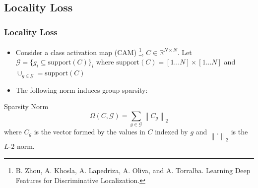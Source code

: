 \subsection{Locality Loss}

\begin{frame}
	\frametitle{Locality Loss}
	\begin{itemize}
		\item Consider a class activation map (CAM) \footnote{\tiny{B. Zhou, A. Khosla, A.
				Lapedriza, A. Oliva, and A. Torralba. Learning Deep Features for Discriminative
		Localization.}}, $C \in \mathbb{R}^{N \times N}$. Let $\mathcal{G} = \{g_i
			\subseteq \textrm{support}(C)\}_i$ where $\textrm{support}(C) = [1 \dots N] \times [1
			\dots N]$ and $\cup_{g \in \mathcal{G}} = \textrm{support}(C)$
		\item The following norm induces group sparsity:
	\end{itemize}

	\begin{block}{Sparsity Norm}
		\begin{equation*}
			\Omega (C, \mathcal{G}) = \sum_{g \in \mathcal{G}} \left\lVert C_g \right\rVert _2
		\end{equation*}
		where $C_g$ is the vector formed by the values in $C$ indexed by $g$ and $\left\lVert . \right\rVert_2$ is
		the $L$-$2$ norm.
	\end{block}
\end{frame}


